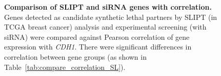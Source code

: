 \begin{figure}[!htp]
\begin{center}
   \end{center}
   \caption[Comparison of SLIPT and siRNA genes with correlation]{\small \textbf{Comparison of  \gls{SLIPT} and \gls{siRNA} genes with correlation.} Genes detected as candidate \gls{synthetic lethal} partners by \gls{SLIPT} (in \gls{TCGA} breast cancer)  analysis and experimental screening (with \gls{siRNA}) were compared against Pearson correlation of \gls{gene expression} with \textit{CDH1}. There were significant differences in correlation between gene groups (as shown in Table~\ref{tab:compare_correlation_SL}). 
}
\label{fig:compare_correlation_SL}
\end{figure}

